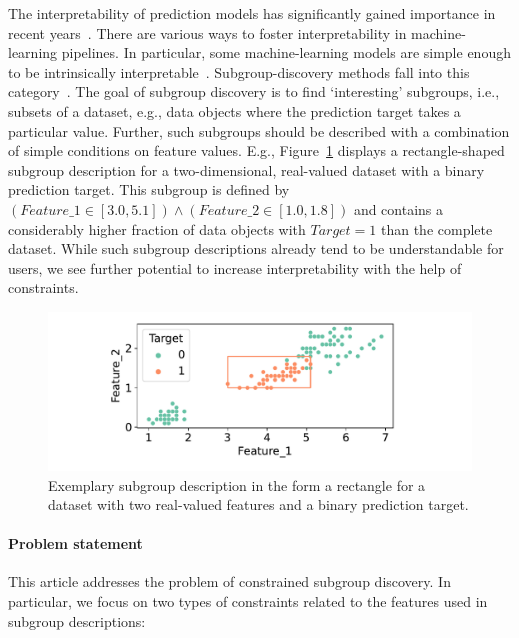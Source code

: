 \documentclass{article}
\theoremstyle{definition}
\begin{document}
The interpretability of prediction models has significantly gained importance in recent years~\cite{carvalho2019machine, molnar2020interpretable}.
There are various ways to foster interpretability in machine-learning pipelines.
In particular, some machine-learning models are simple enough to be intrinsically interpretable~\cite{carvalho2019machine}.
Subgroup-discovery methods fall into this category~\cite{atzmueller2015subgroup}.
The goal of subgroup discovery is to find `interesting' subgroups, i.e., subsets of a dataset, e.g., data objects where the prediction target takes a particular value.
Further, such subgroups should be described with a combination of simple conditions on feature values.
E.g., Figure~\ref{fig:csd:exemplary-subgroup} displays a rectangle-shaped subgroup description for a two-dimensional, real-valued dataset with a binary prediction target.
This subgroup is defined by $(\mathit{Feature\_1} \in [3.0, 5.1]) \land (\mathit{Feature\_2} \in [1.0, 1.8])$ and contains a considerably higher fraction of data objects with $\mathit{Target} = 1$ than the complete dataset.
While such subgroup descriptions already tend to be understandable for users, we see further potential to increase interpretability with the help of constraints.

\begin{figure}[t]
	\centering
	\includegraphics[width=\textwidth, trim=15 20 15 15, clip]{plots/csd-exemplary-subgroup.pdf}
	\caption{
		Exemplary subgroup description in the form a rectangle for a dataset with two real-valued features and a binary prediction target.
	}
	\label{fig:csd:exemplary-subgroup}
\end{figure}

\paragraph{Problem statement}

This article addresses the problem of constrained subgroup discovery.
In particular, we focus on two types of constraints related to the features used in subgroup descriptions:
\end{document}
